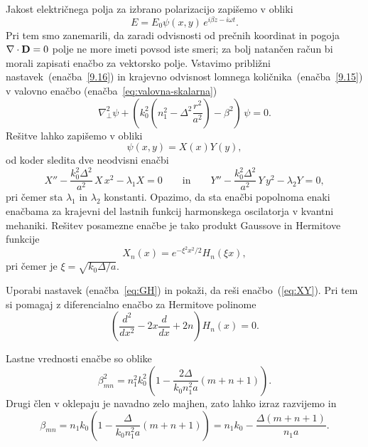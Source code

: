 Jakost električnega polja za izbrano polarizacijo zapišemo v obliki 
\begin{equation}
E=E_{0}\psi(x,y)\, e^{i\beta z-i\omega t}.
\label{9.16}
\end{equation}
Pri tem smo zanemarili, da zaradi odvisnosti od prečnih koordinat in pogoja $\nabla\cdot{\bf D}=0$
polje ne more imeti povsod iste smeri; za bolj natančen račun bi morali zapisati enačbo za
vektorsko polje. Vstavimo približni
nastavek~(enačba~\ref{9.16}) in krajevno odvisnost lomnega količnika~(enačba~\ref{9.15})
v valovno enačbo (enačba~\ref{eq:valovna-skalarna}) 
\begin{equation}
\nabla_{\perp}^{2}\psi+\left(k_{0}^{2}\left(n_{1}^{2}-\Delta^{2}\frac{r^{2}}{a^2}\right)-
\beta^{2}\right)\,\psi=0.
\label{9.17}
\end{equation}
Rešitve lahko zapišemo v obliki
\begin{equation}
\psi(x,y) = X(x)Y(y),
\end{equation}
od koder sledita dve neodvisni enačbi
\begin{equation}
X'' - \frac{k_0^2 \Delta^2}{a^2}\,X\,x^2 - \lambda_1 X = 0 \qquad \mathrm{in} \qquad
Y'' - \frac{k_0^2 \Delta^2}{a^2}\,Y\,y^2 - \lambda_2 Y = 0,
\label{eq:XY}
\end{equation}
pri čemer sta $\lambda_1$ in $\lambda_2$ konstanti. 
Opazimo, da sta enačbi popolnoma enaki enačbama za krajevni del lastnih funkcij 
harmonskega oscilatorja v kvantni mehaniki. Rešitev posamezne enačbe je tako 
produkt Gaussove in Hermitove funkcije
\begin{equation}
X_n(x) = e^{-\xi^2 x^2/2} H_n(\xi x),
\label{eq:GH}
\end{equation}
pri čemer je $\xi = \sqrt{k_0 \Delta/a}$.
\begin{definition}
Uporabi nastavek (enačba~\ref{eq:GH}) in pokaži, da reši enačbo~(\ref{eq:XY}). Pri tem si pomagaj z 
diferencialno enačbo za Hermitove polinome
\begin{equation}
\left( \frac{d^2}{dx^2}-2x\frac{d}{dx}+2n \right) H_n(x) = 0.
\end{equation}
\end{definition}
Lastne vrednosti enačbe so oblike
\begin{equation}
\beta_{mn}^{2}=n_{1}^{2}k_{0}^{2}\left(1-\frac{2\Delta}{k_{0}n_{1}^2a}\left(m+n+1\right)\right).
\label{9.19}
\end{equation}
Drugi člen v oklepaju je navadno zelo majhen, zato lahko izraz razvijemo in 
\begin{equation}
\beta_{mn}=n_{1}k_{0}\left(1-\frac{\Delta}{k_{0}n_{1}^2 a}\left(m+n+1\right)\right)
= n_{1}k_{0} - \frac{\Delta \left(m+n+1\right)}{n_{1} a}.
\end{equation}
